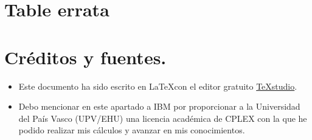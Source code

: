 \documentclass[a4paper,12pt]{article}
\begin{document}
\section{Table errata}

	
\section{Créditos y fuentes.}
	
	\begin{itemize}
		\item Este documento ha sido escrito en \LaTeX con el editor gratuito  \href{https://www.texstudio.org/}{TeXstudio}.
		\item Debo mencionar en este apartado a IBM por proporcionar a la Universidad del País Vasco (UPV/EHU) una licencia académica de CPLEX \texttrademark con la que he podido realizar mis cálculos y avanzar en mis conocimientos.
	\end{itemize}
	
	
	
	
	
\end{document}
